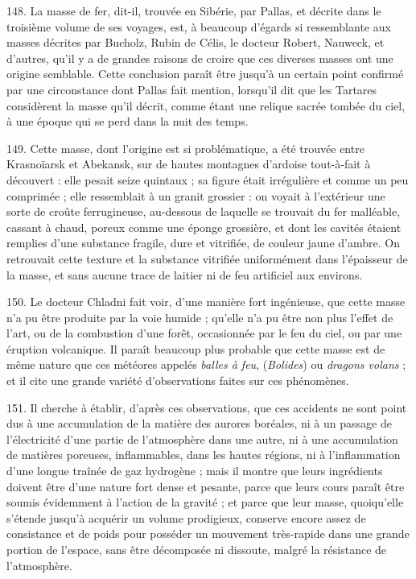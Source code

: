 \documentclass[a4paper, 11pt, oneside, polutonikogreek, french]{article}
\begin{document}
148. \og La masse de fer, dit-il, trouvée en Sibérie, par Pallas, et décrite dans le troisième volume de ses voyages, est, à beaucoup d'égards si ressemblante aux masses décrites par Bucholz, Rubin de Célis, le docteur Robert, Nauweck, et d'autres, qu'il y a de grandes raisons de croire que ces diverses masses ont une origine semblable. Cette conclusion paraît être jusqu'à un certain point confirmé par une circonstance dont Pallas fait mention, lorsqu'il dit que les Tartares considèrent la masse qu'il décrit, comme étant une relique sacrée tombée du ciel, à une époque qui se perd dans la nuit des temps. \fg

149. \og Cette masse, dont l'origine est si problématique, a été trouvée entre Krasnoïarsk et Abekansk, sur de hautes montagnes d'ardoise tout-à-fait à découvert : elle pesait seize quintaux ; sa figure était irrégulière et comme un peu comprimée ; elle ressemblait à un granit grossier : on voyait à l'extérieur une sorte de croûte ferrugineuse, au-dessous de laquelle se trouvait du fer malléable, cassant à chaud, poreux comme une éponge grossière, et dont les cavités étaient remplies d'une substance fragile, dure et vitrifiée, de couleur jaune d'ambre. On retrouvait cette texture et la substance vitrifiée uniformément dans l'épaisseur de la masse, et sans aucune trace de laitier ni de feu artificiel aux environs. \fg

150. \og Le docteur Chladni fait voir, d'une manière fort ingénieuse, que cette masse n'a pu être produite par la voie humide ; qu'elle n'a pu être non plus l'effet de l'art, ou de la combustion d'une forêt, occasionnée par le feu du ciel, ou par une éruption volcanique. Il paraît beaucoup plus probable que cette masse est de même nature que ces météores appelés \emph{balles à feu}, (\emph{Bolides}) ou \emph{dragons volans} ; et il cite une grande variété d'observations faites sur ces phénomènes. \fg

151. \og Il cherche à établir, d'après ces observations, que ces accidents ne sont point dus à une accumulation de la matière des aurores boréales, ni à un passage de l'électricité d'une partie de l'atmosphère dans une autre, ni à une accumulation de matières poreuses, inflammables, dans les hautes régions, ni à l'inflammation d'une longue traînée de gaz hydrogène ; mais il montre que leurs ingrédients doivent être d'une nature fort dense et pesante, parce que leurs cours paraît être soumis évidemment à l'action de la gravité ; et parce que leur masse, quoiqu'elle s'étende jusqu'à acquérir un volume prodigieux, conserve encore assez de consistance et de poids pour posséder un mouvement très-rapide dans une grande portion de l'espace, sans être décomposée ni dissoute, malgré la résistance de l'atmosphère. \fg
\end{document}
